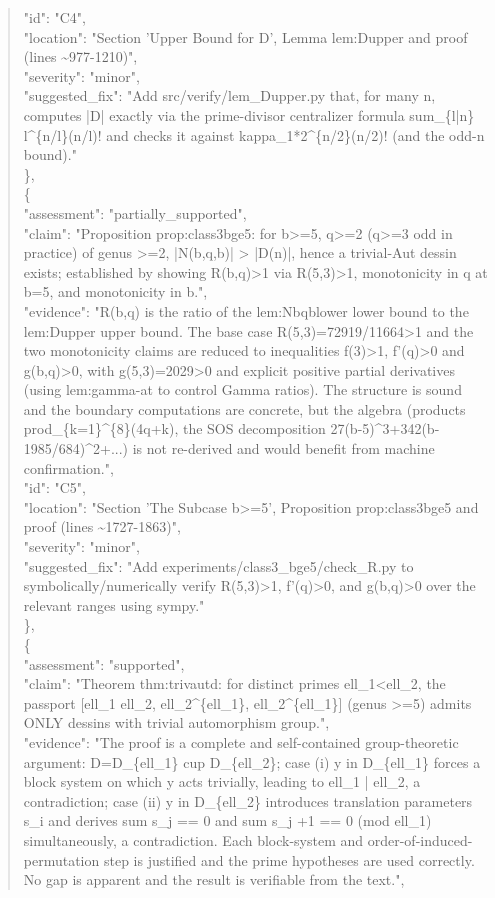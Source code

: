 \documentclass[11pt]{article}
\begin{document}
\begin{quote}
      "id": "C4",\\
      "location": "Section 'Upper Bound for D', Lemma lem:Dupper and proof (lines \~{}977-1210)",\\
      "severity": "minor",\\
      "suggested\_fix": "Add src/verify/lem\_Dupper.py that, for many n, computes |D| exactly via the prime-divisor centralizer formula sum\_\{l|n\} l\^{}\{n/l\}(n/l)! and checks it against kappa\_1*2\^{}\{n/2\}(n/2)! (and the odd-n bound)."\\
    \},\\
    \{\\
      "assessment": "partially\_supported",\\
      "claim": "Proposition prop:class3bge5: for b>=5, q>=2 (q>=3 odd in practice) of genus >=2, |N(b,q,b)| > |D(n)|, hence a trivial-Aut dessin exists; established by showing R(b,q)>1 via R(5,3)>1, monotonicity in q at b=5, and monotonicity in b.",\\
      "evidence": "R(b,q) is the ratio of the lem:Nbqblower lower bound to the lem:Dupper upper bound. The base case R(5,3)=72919/11664>1 and the two monotonicity claims are reduced to inequalities f(3)>1, f'(q)>0 and g(b,q)>0, with g(5,3)=2029>0 and explicit positive partial derivatives (using lem:gamma-at to control Gamma ratios). The structure is sound and the boundary computations are concrete, but the algebra (products prod\_\{k=1\}\^{}\{8\}(4q+k), the SOS decomposition 27(b-5)\^{}3+342(b-1985/684)\^{}2+...) is not re-derived and would benefit from machine confirmation.",\\
      "id": "C5",\\
      "location": "Section 'The Subcase b>=5', Proposition prop:class3bge5 and proof (lines \~{}1727-1863)",\\
      "severity": "minor",\\
      "suggested\_fix": "Add experiments/class3\_bge5/check\_R.py to symbolically/numerically verify R(5,3)>1, f'(q)>0, and g(b,q)>0 over the relevant ranges using sympy."\\
    \},\\
    \{\\
      "assessment": "supported",\\
      "claim": "Theorem thm:trivautd: for distinct primes ell\_1<ell\_2, the passport [ell\_1 ell\_2, ell\_2\^{}\{ell\_1\}, ell\_2\^{}\{ell\_1\}] (genus >=5) admits ONLY dessins with trivial automorphism group.",\\
      "evidence": "The proof is a complete and self-contained group-theoretic argument: D=D\_\{ell\_1\} cup D\_\{ell\_2\}; case (i) y in D\_\{ell\_1\} forces a block system on which y acts trivially, leading to ell\_1 | ell\_2, a contradiction; case (ii) y in D\_\{ell\_2\} introduces translation parameters s\_i and derives sum s\_j == 0 and sum s\_j +1 == 0 (mod ell\_1) simultaneously, a contradiction. Each block-system and order-of-induced-permutation step is justified and the prime hypotheses are used correctly. No gap is apparent and the result is verifiable from the text.",\\

\end{quote}
\end{document}

